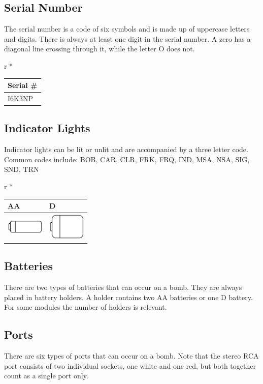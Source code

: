 \subsection*{Serial Number}\label{subsec:serial-number1}
The serial number is a code of six symbols and is made up
of uppercase letters and digits. There is always at least
one digit in the serial number. A zero has a diagonal line
crossing through it, while the letter O does not.

\begin{table}[-1]{r}
  *
  \begin{tabular}{| p{4cm} |}
    \hline
    Serial \#
    \\ \hline
    \huge{I6K3NP}
    \\ \hline
  \end{tabular}\label{tab:light}
\end{table}
\subsection*{Indicator Lights}\label{subsec:indicator-lights}
Indicator lights can be lit or unlit and are accompanied
by a three letter code. Common codes include:
BOB, CAR, CLR, FRK, FRQ, IND, MSA, NSA, SIG, SND, TRN

\begin{table}[-1]{r}
  *
  \begin{tabular}{| m{2cm} | m{2cm} |}
    \hline
    AA & D
    \\ \hline
    \includegraphics[width=1.8cm]{modules/0_explanation/battery_aa} &
    \includegraphics[width=1.8cm]{modules/0_explanation/battery_d}
    \\ \hline
  \end{tabular}\label{tab:batteries}
\end{table}
\subsection*{Batteries}\label{subsec:batteries}
There are two types of batteries that can occur on a
bomb. They are always placed in battery holders. A
holder contains two AA batteries or one D battery.
For some modules the number of holders is relevant.

\subsection*{Ports}\label{subsec:ports}
There are six types of ports that can occur on a bomb. Note that the stereo
RCA port consists of two individual sockets, one white and one red, but
both together count as a single port only.
